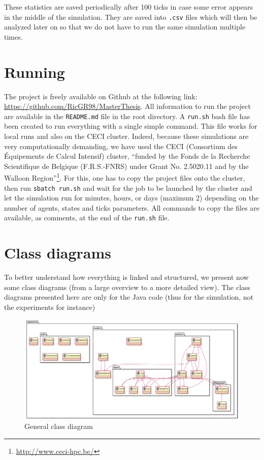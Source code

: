 These statistics are saved periodically after 100 ticks in case some error appears in the middle of the simulation. They are saved into \texttt{.csv} files which will then be analyzed later on so that we do not have to run the same simulation multiple times. 


\section{Running}
The project is freely available on Github at the following link: \url{https://github.com/RicGR98/MasterThesis}. All information to run the project are available in the \texttt{README.md} file in the root directory. A \texttt{run.sh} bash file has been created to run everything with a single simple command. This file works for local runs and also on the CECI cluster. Indeed, because these simulations are very computationally demanding, we have used the CECI (Consortium des Équipements de Calcul Intensif) cluster, ``funded by the Fonds de la Recherche Scientifique de Belgique (F.R.S.-FNRS) under Grant No. 2.5020.11 and by the Walloon Region''\footnote{\url{http://www.ceci-hpc.be/}}. For this, one has to copy the project files onto the cluster, then run \texttt{sbatch run.sh} and wait for the job to be launched by the cluster and let the simulation run for minutes, hours, or days (maximum 2) depending on the number of agents, states and ticks parameters. All commands to copy the files are available, as comments, at the end of the \texttt{run.sh} file.


\section{Class diagrams}

    To better understand how everything is linked and structured, we present now some class diagrams (from a large overview to a more detailed view). The class diagrams presented here are only for the Java code (thus for the simulation, not the experiments for instance)


    \begin{figure}[H]
        \centering
        \includegraphics[width=1\textwidth]{img/generalCD.png}
        \caption{General class diagram}
        \label{fig:class_diagram_general}
    \end{figure}


